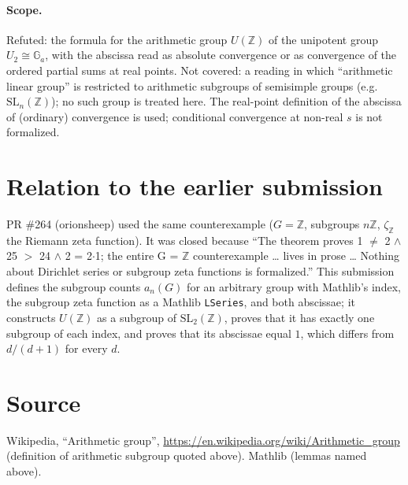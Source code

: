 \documentclass[11pt]{article}
\theoremstyle{definition}
\newcommand{\Z}{\mathbb Z}
\begin{document}
\paragraph{Scope.} Refuted: the formula for the arithmetic group $U(\Z)$ of the unipotent group
$U_2\cong\mathbb G_a$, with the abscissa read as absolute convergence or as convergence of the
ordered partial sums at real points. Not covered: a reading in which ``arithmetic linear group''
is restricted to arithmetic subgroups of semisimple groups (e.g.\ $\mathrm{SL}_n(\Z)$); no such
group is treated here. The real-point definition of the abscissa of (ordinary) convergence is
used; conditional convergence at non-real $s$ is not formalized.

\section{Relation to the earlier submission}
PR \#264 (orionsheep) used the same counterexample ($G=\Z$, subgroups $n\Z$, $\zeta_\Z$ the
Riemann zeta function). It was closed because ``The theorem proves 1 $\ne$ 2 $\wedge$ 25 $>$ 24
$\wedge$ 2 = 2$\cdot$1; the entire G = $\Z$ counterexample \ldots{} lives in prose \ldots{}
Nothing about Dirichlet series or subgroup zeta functions is formalized.'' This submission
defines the subgroup counts $a_n(G)$ for an arbitrary group with Mathlib's index, the subgroup
zeta function as a Mathlib \texttt{LSeries}, and both abscissae; it constructs $U(\Z)$ as a
subgroup of $\mathrm{SL}_2(\Z)$, proves that it has exactly one subgroup of each index, and
proves that its abscissae equal $1$, which differs from $d/(d+1)$ for every $d$.

\section*{Source}
Wikipedia, ``Arithmetic group'', \url{https://en.wikipedia.org/wiki/Arithmetic_group}
(definition of arithmetic subgroup quoted above). Mathlib (lemmas named above).
\end{document}
